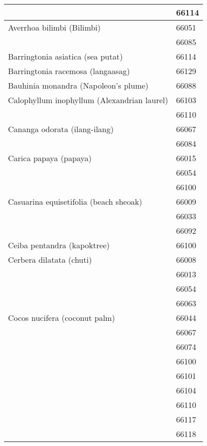 \begin{longtable}{ll}
                                    & 66114 \\
\midrule
Averrhoa bilimbi (Bilimbi) & 66051 \\
                                    & 66085 \\
\midrule
Barringtonia asiatica (sea putat) & 66114 \\
\midrule
Barringtonia racemosa (langaasag) & 66129 \\
\midrule
Bauhinia monandra (Napoleon's plume) & 66088 \\
\midrule
Calophyllum inophyllum (Alexandrian laurel) & 66103 \\
                                    & 66110 \\
\midrule
Cananga odorata (ilang-ilang) & 66067 \\
                                    & 66084 \\
\midrule
Carica papaya (papaya) & 66015 \\
                                    & 66054 \\
                                    & 66100 \\
\midrule
Casuarina equisetifolia (beach sheoak) & 66009 \\
                                    & 66033 \\
                                    & 66092 \\
\midrule
Ceiba pentandra (kapoktree) & 66100 \\
\midrule
Cerbera dilatata (chuti) & 66008 \\
                                    & 66013 \\
                                    & 66054 \\
                                    & 66063 \\
\midrule
Cocos nucifera (coconut palm) & 66044 \\
                                    & 66067 \\
                                    & 66074 \\
                                    & 66100 \\
                                    & 66101 \\
                                    & 66104 \\
                                    & 66110 \\
                                    & 66117 \\
                                    & 66118 \\

\end{longtable}
